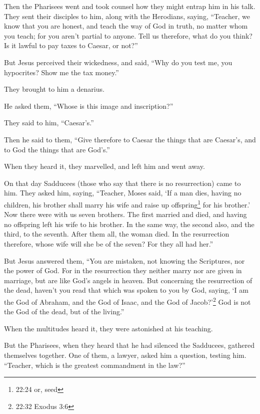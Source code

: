 Then the Pharisees went and took counsel how they might
entrap him in his talk.  They sent their disciples to him,
along with the Herodians, saying, ``Teacher, we know that you are
honest, and teach the way of God in truth, no matter whom you teach; for
you aren't partial to anyone.  Tell us therefore, what do
you think? Is it lawful to pay taxes to Caesar, or not?''

 But Jesus perceived their wickedness, and said, ``Why do
you test me, you hypocrites?  Show me the tax money.''

They brought to him a denarius.

 He asked them, ``Whose is this image and inscription?''

 They said to him, ``Caesar's.''

Then he said to them, ``Give therefore to Caesar the things that are
Caesar's, and to God the things that are God's.''

 When they heard it, they marvelled, and left him and went
away.

 On that day Sadducees (those who say that there is no
resurrection) came to him. They asked him,  saying,
``Teacher, Moses said, `If a man dies, having no children, his brother
shall marry his wife and raise up offspring\footnote{22:24 or, seed} for
his brother.'  Now there were with us seven brothers. The
first married and died, and having no offspring left his wife to his
brother.  In the same way, the second also, and the third,
to the seventh.  After them all, the woman died.
 In the resurrection therefore, whose wife will she be of
the seven? For they all had her.''

 But Jesus answered them, ``You are mistaken, not knowing
the Scriptures, nor the power of God.  For in the
resurrection they neither marry nor are given in marriage, but are like
God's angels in heaven.  But concerning the resurrection of
the dead, haven't you read that which was spoken to you by God, saying,
 `I am the God of Abraham, and the God of Isaac, and the
God of Jacob?'\footnote{22:32 Exodus 3:6} God is not the God of the
dead, but of the living.''

 When the multitudes heard it, they were astonished at his
teaching.

 But the Pharisees, when they heard that he had silenced
the Sadducees, gathered themselves together.  One of them,
a lawyer, asked him a question, testing him.  ``Teacher,
which is the greatest commandment in the law?''

